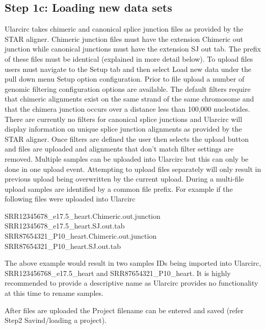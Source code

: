 \documentclass[12pt]{article}\usepackage[]{graphicx}\usepackage[]{color}
\begin{document}
\subsection{Step 1c: Loading new data sets} \label{sec:Step1c}
Ularcirc takes chimeric and canonical splice junction files as provided by the STAR aligner. Chimeric junction files must have the extension Chimeric out junction while canonical junctions must have the extension SJ out tab. The prefix of these files must be identical (explained in more detail below). To upload files users must navigate to the Setup tab and then select Load new data under the pull down menu Setup option configuration. Prior to file upload a number of genomic filtering configuration options are available. The default filters require that chimeric alignments exist on the same strand of the same chromosome and that the chimera junction occurs over a distance less than 100,000 nucleotides.  There are currently no filters for canonical splice junctions and Ularcirc will display information on unique splice junction alignments as provided by the STAR aligner. Once filters are defined the user then selects the upload button and files are uploaded and alignments that don’t match filter settings are removed.
\indent Multiple samples can be uploaded into Ularcirc but this can only be done in one upload event. Attempting to upload files separately will only result in previous upload being overwritten by the current upload. During a multi-file upload samples are identified by a common file prefix.  For example if the following files were uploaded into Ularcirc

\noindent
\begin{mdframed}
SRR12345678\_e17.5\_heart.Chimeric.out.junction \\
SRR12345678\_e17.5\_heart.SJ.out.tab            \\
SRR87654321\_P10\_heart.Chimeric.out.junction   \\
SRR87654321\_P10\_heart.SJ.out.tab
\end{mdframed}


The above example would result in two samples IDs being imported into Ularcirc, SRR123456768\_e17.5\_heart and SRR87654321\_P10\_heart. It is highly recommended to provide a descriptive name as Ularcirc provides no functionality at this time to rename samples.

After files are uploaded the Project filename can be entered and saved (refer Step2 Savind/loading a project).


\end{document}
